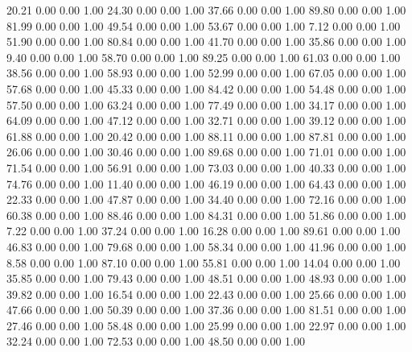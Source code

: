    20.21   0.00   0.00   1.00
   24.30   0.00   0.00   1.00
   37.66   0.00   0.00   1.00
   89.80   0.00   0.00   1.00
   81.99   0.00   0.00   1.00
   49.54   0.00   0.00   1.00
   53.67   0.00   0.00   1.00
    7.12   0.00   0.00   1.00
   51.90   0.00   0.00   1.00
   80.84   0.00   0.00   1.00
   41.70   0.00   0.00   1.00
   35.86   0.00   0.00   1.00
    9.40   0.00   0.00   1.00
   58.70   0.00   0.00   1.00
   89.25   0.00   0.00   1.00
   61.03   0.00   0.00   1.00
   38.56   0.00   0.00   1.00
   58.93   0.00   0.00   1.00
   52.99   0.00   0.00   1.00
   67.05   0.00   0.00   1.00
   57.68   0.00   0.00   1.00
   45.33   0.00   0.00   1.00
   84.42   0.00   0.00   1.00
   54.48   0.00   0.00   1.00
   57.50   0.00   0.00   1.00
   63.24   0.00   0.00   1.00
   77.49   0.00   0.00   1.00
   34.17   0.00   0.00   1.00
   64.09   0.00   0.00   1.00
   47.12   0.00   0.00   1.00
   32.71   0.00   0.00   1.00
   39.12   0.00   0.00   1.00
   61.88   0.00   0.00   1.00
   20.42   0.00   0.00   1.00
   88.11   0.00   0.00   1.00
   87.81   0.00   0.00   1.00
   26.06   0.00   0.00   1.00
   30.46   0.00   0.00   1.00
   89.68   0.00   0.00   1.00
   71.01   0.00   0.00   1.00
   71.54   0.00   0.00   1.00
   56.91   0.00   0.00   1.00
   73.03   0.00   0.00   1.00
   40.33   0.00   0.00   1.00
   74.76   0.00   0.00   1.00
   11.40   0.00   0.00   1.00
   46.19   0.00   0.00   1.00
   64.43   0.00   0.00   1.00
   22.33   0.00   0.00   1.00
   47.87   0.00   0.00   1.00
   34.40   0.00   0.00   1.00
   72.16   0.00   0.00   1.00
   60.38   0.00   0.00   1.00
   88.46   0.00   0.00   1.00
   84.31   0.00   0.00   1.00
   51.86   0.00   0.00   1.00
    7.22   0.00   0.00   1.00
   37.24   0.00   0.00   1.00
   16.28   0.00   0.00   1.00
   89.61   0.00   0.00   1.00
   46.83   0.00   0.00   1.00
   79.68   0.00   0.00   1.00
   58.34   0.00   0.00   1.00
   41.96   0.00   0.00   1.00
    8.58   0.00   0.00   1.00
   87.10   0.00   0.00   1.00
   55.81   0.00   0.00   1.00
   14.04   0.00   0.00   1.00
   35.85   0.00   0.00   1.00
   79.43   0.00   0.00   1.00
   48.51   0.00   0.00   1.00
   48.93   0.00   0.00   1.00
   39.82   0.00   0.00   1.00
   16.54   0.00   0.00   1.00
   22.43   0.00   0.00   1.00
   25.66   0.00   0.00   1.00
   47.66   0.00   0.00   1.00
   50.39   0.00   0.00   1.00
   37.36   0.00   0.00   1.00
   81.51   0.00   0.00   1.00
   27.46   0.00   0.00   1.00
   58.48   0.00   0.00   1.00
   25.99   0.00   0.00   1.00
   22.97   0.00   0.00   1.00
   32.24   0.00   0.00   1.00
   72.53   0.00   0.00   1.00
   48.50   0.00   0.00   1.00
